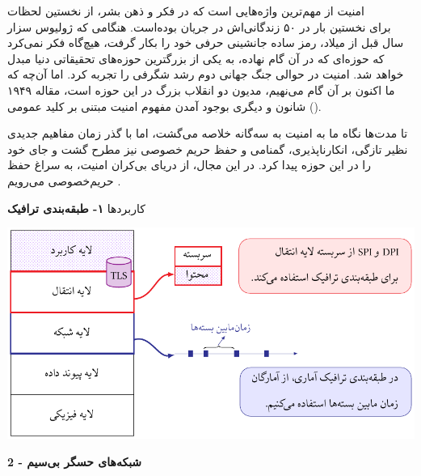 \documentclass[debug,a0paper,portrait,persian]{xebaposter}
\begin{document}
\begin{poster}
\begin{posterbox}[name=introduction,column=0,row=0]{}
امنیت از مهم‌ترین واژه‌هایی است که در فکر و ذهن بشر، از نخستین لحظات زندگانی‌اش در جریان بوده‌است. هنگامی که  ژولیوس سزار‎‎
برای نخستین بار در ۵۰ سال قبل از میلاد، رمز ساده جانشینی حرفی خود را بکار گرفت، هیچ‌گاه فکر نمی‌کرد که حوزه‌ای که در آن گام نهاده، به یکی از بزرگترین حوزه‌های تحقیقاتی دنیا مبدل خواهد شد.  امنیت در حوالی جنگ جهانی دوم رشد شگرفی را تجربه کرد. اما آن‌چه که ما اکنون بر  آن گام می‌نهیم، مدیون دو انقلاب  بزرگ در این حوزه است، مقاله ۱۹۴۹ شانون
 و دیگری بوجود آمدن مفهوم امنیت مبتنی بر کلید عمومی
().

تا مدت‌ها نگاه ما به امنیت به سه‌گانه
خلاصه می‌گشت، اما با گذر زمان مفاهیم جدیدی نظیر تازگی، انکارناپذیری، گمنامی و حفظ حریم خصوصی نیز مطرح گشت و جای خود را در این حوزه پیدا کرد. در این مجال، از دریای بی‌کران امنیت، به سراغ حفظ حریم‌خصوصی می‌رویم
\cite{menezes1996handbook}.




\end{posterbox}
\begin{posterbox}[name=phase2,column=1,span=1]{کاربردها}
\textbf{۱- طبقه‌بندی ترافیک}

\centerline{\includegraphics[width=\linewidth]{images/networkLayer}}


\textbf{2 - شبکه‌های حسگر بی‌سیم}


\end{posterbox}
\end{poster}
\end{document}
